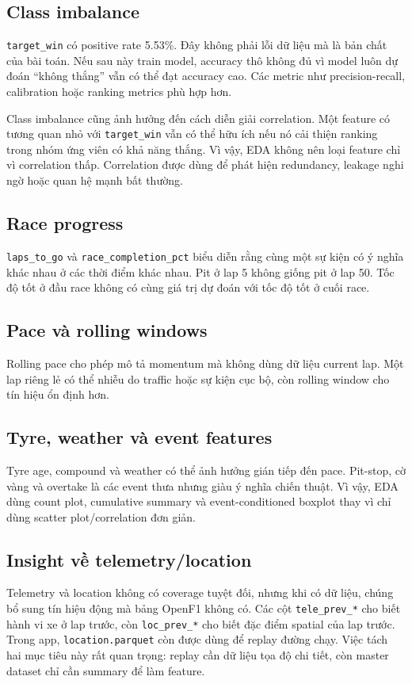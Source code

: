 \documentclass[conference]{IEEEtran}
\begin{document}
\subsection{Class imbalance}
\texttt{target\_win} có positive rate 5.53\%. Đây không phải lỗi dữ liệu mà là bản chất của bài toán. Nếu sau này train model, accuracy thô không đủ vì model luôn dự đoán ``không thắng'' vẫn có thể đạt accuracy cao. Các metric như precision-recall, calibration hoặc ranking metrics phù hợp hơn.

Class imbalance cũng ảnh hưởng đến cách diễn giải correlation. Một feature có tương quan nhỏ với \texttt{target\_win} vẫn có thể hữu ích nếu nó cải thiện ranking trong nhóm ứng viên có khả năng thắng. Vì vậy, EDA không nên loại feature chỉ vì correlation thấp. Correlation được dùng để phát hiện redundancy, leakage nghi ngờ hoặc quan hệ mạnh bất thường.

\subsection{Race progress}
\texttt{laps\_to\_go} và \texttt{race\_completion\_pct} biểu diễn rằng cùng một sự kiện có ý nghĩa khác nhau ở các thời điểm khác nhau. Pit ở lap 5 không giống pit ở lap 50. Tốc độ tốt ở đầu race không có cùng giá trị dự đoán với tốc độ tốt ở cuối race.

\subsection{Pace và rolling windows}
Rolling pace cho phép mô tả momentum mà không dùng dữ liệu current lap. Một lap riêng lẻ có thể nhiễu do traffic hoặc sự kiện cục bộ, còn rolling window cho tín hiệu ổn định hơn.

\subsection{Tyre, weather và event features}
Tyre age, compound và weather có thể ảnh hưởng gián tiếp đến pace. Pit-stop, cờ vàng và overtake là các event thưa nhưng giàu ý nghĩa chiến thuật. Vì vậy, EDA dùng count plot, cumulative summary và event-conditioned boxplot thay vì chỉ dùng scatter plot/correlation đơn giản.

\subsection{Insight về telemetry/location}
Telemetry và location không có coverage tuyệt đối, nhưng khi có dữ liệu, chúng bổ sung tín hiệu động mà bảng OpenF1 không có. Các cột \texttt{tele\_prev\_*} cho biết hành vi xe ở lap trước, còn \texttt{loc\_prev\_*} cho biết đặc điểm spatial của lap trước. Trong app, \texttt{location.parquet} còn được dùng để replay đường chạy. Việc tách hai mục tiêu này rất quan trọng: replay cần dữ liệu tọa độ chi tiết, còn master dataset chỉ cần summary để làm feature.
\end{document}
